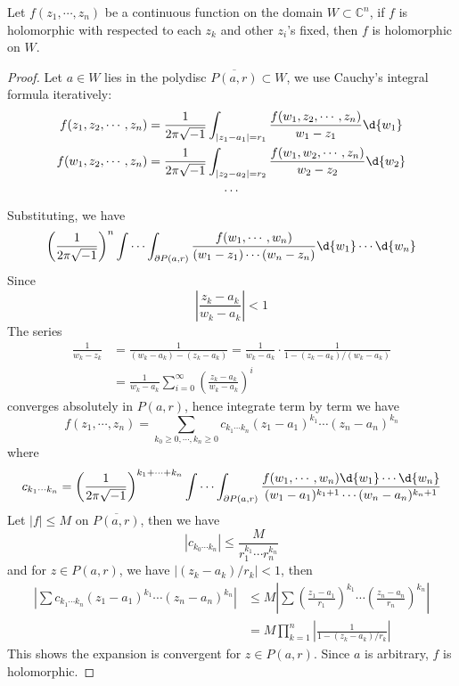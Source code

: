 \begin{thm}[Osgood]\label{osgood}
    Let $f(z_1,\cdots,z_n)$ be a continuous function on the domain $W\subset\mathbb{C}^n$, if $f$ is holomorphic with respected to each $z_k$ and other $z_i$'s fixed, then $f$ is holomorphic on $W$.
\end{thm}
\begin{proof}
    Let $a\in W$ lies in the polydisc $\overline{P(a,r)}\subset W$, we use Cauchy's integral formula iteratively:
    \begin{gather*}
        f(z_1,z_2,\cdots,z_n)=\frac{1}{2\pi\sqrt{-1}}\int_{|z_1-a_1|=r_1}\frac{f(w_1,z_2,\cdots,z_n)}{w_1-z_1}\d{w_1}\\
        f(w_1,z_2,\cdots,z_n)=\frac{1}{2\pi\sqrt{-1}}\int_{|z_2-a_2|=r_2}\frac{f(w_1,w_2,\cdots,z_n)}{w_2-z_2}\d{w_2}\\
        \cdots
    \end{gather*}
    Substituting, we have
    \[\left(\frac{1}{2\pi\sqrt{-1}}\right)^n\idotsint_{\partial P(a,r)}\frac{f(w_1,\cdots,w_n)}{(w_1-z_1)\cdots(w_n-z_n)}\d{w_1}\cdots\d{w_n}\]
    Since
    \[\left|\frac{z_k-a_k}{w_k-a_k}\right|<1\]
    The series
    \begin{align*}
        \frac{1}{w_k-z_k}&=\frac{1}{(w_k-a_k)-(z_k-a_k)}=\frac{1}{w_k-a_k}\cdot\frac{1}{1-(z_k-a_k)/(w_k-a_k)}\\
        &=\frac{1}{w_k-a_k}\sum_{i=0}^\infty\left(\frac{z_k-a_k}{w_k-a_k}\right)^i
    \end{align*}
    converges absolutely in $P(a,r)$, hence integrate term by term we have
    \[f(z_1,\cdots,z_n)=\sum_{k_0\geq 0,\cdots,k_n\geq 0}c_{k_1\cdots k_n}(z_1-a_1)^{k_1}\cdots(z_n-a_n)^{k_n}\]
    where
    \[c_{k_1\cdots k_n}=\left(\frac{1}{2\pi\sqrt{-1}}\right)^{k_1+\cdots+k_n}\idotsint_{\partial P(a,r)}\frac{f(w_1,\cdots,w_n)\d{w_1}\cdots\d{w_n}}{(w_1-a_1)^{k_1+1}\cdots(w_n-a_n)^{k_n+1}}\]
    Let $|f|\leq M$ on $\overline{P(a,r)}$, then we have
    \[|c_{k_0\cdots k_n}|\leq\frac{M}{r_1^{k_1}\cdots r_n^{k_n}}\]
    and for $z\in P(a,r)$, we have $|(z_k-a_k)/r_k|<1$, then
    \begin{align*}
        \left|\sum c_{k_1\cdots k_n}(z_1-a_1)^{k_1}\cdots(z_n-a_n)^{k_n}\right|&\leq M\left|\sum\left(\frac{z_1-a_1}{r_1}\right)^{k_1}\cdots\left(\frac{z_n-a_n}{r_n}\right)^{k_n}\right|\\
        &=M\prod_{k=1}^n\left|\frac{1}{1-(z_k-a_k)/r_k}\right|
    \end{align*}
    This shows the expansion is convergent for $z\in P(a,r)$.
    Since $a$ is arbitrary, $f$ is holomorphic.
\end{proof}

